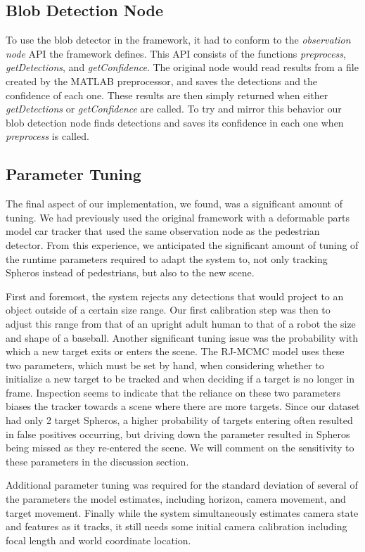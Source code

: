 \subsection{Blob Detection Node}
To use the blob detector in the framework, it had to conform to the \emph{observation node} API the framework defines. This API
consists of the functions \emph{preprocess}, \emph{getDetections}, and \emph{getConfidence}. The original node would read
results from a file created by the MATLAB preprocessor, and saves the detections and the confidence of each one.  These results
are then simply returned when either \emph{getDetections} or \emph{getConfidence} are called. To try and mirror this behavior
our blob detection node finds detections and saves its confidence in each one when \emph{preprocess} is called.

\subsection{Parameter Tuning}
The final aspect of our implementation, we found, was a significant amount of tuning. We had previously used the original
framework with a deformable parts model car tracker that used the same observation node as the pedestrian detector. From this
experience, we anticipated the significant amount of tuning of the runtime parameters required to adapt the system to, not only
tracking Spheros instead of pedestrians, but also to the new scene.

First and foremost, the system rejects any detections that would project to an object outside of a certain size range. Our first
calibration step was then to adjust this range from that of an upright adult human to that of a robot the size and shape of a
baseball. Another significant tuning issue was the probability with which a new target exits or enters the scene. The RJ-MCMC
model uses these two parameters, which must be set by hand, when considering whether to initialize a new target to be tracked
and when deciding if a target is no longer in frame. Inspection seems to indicate that the reliance on these two parameters biases
the tracker towards a scene where there are more targets. Since our dataset had only 2 target Spheros, a higher probability of
targets entering often resulted in false positives occurring, but driving down the parameter resulted in Spheros being missed as
they re-entered the scene. We will comment on the sensitivity to these parameters in the discussion section.

Additional parameter tuning was required for the standard deviation of several of the parameters the model estimates, including
horizon, camera movement, and target movement. Finally while the system simultaneously estimates camera state and features
as it tracks, it still needs some initial camera calibration including focal length and world coordinate location.